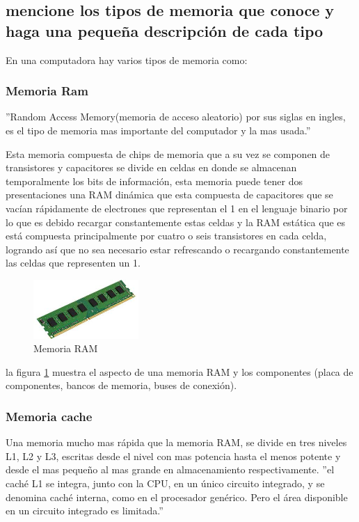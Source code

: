 \documentclass{article}
\begin{document}
    \subsection{mencione los tipos de memoria que conoce y haga una pequeña descripción de cada tipo}
    En una computadora hay varios tipos de memoria como: 
    
        \subsubsection{Memoria Ram}
        ''Random Access Memory(memoria de acceso aleatorio) por sus siglas en ingles, es el tipo de memoria mas importante del computador y la mas usada.'' \cite{arquitectura} \newline

        Esta memoria compuesta de chips de memoria que a su vez se componen de transistores y capacitores se divide en celdas en donde se almacenan temporalmente los bits de información, esta memoria puede tener dos presentaciones una RAM dinámica que esta compuesta de capacitores que se vacían rápidamente de electrones que representan el 1 en el lenguaje binario por lo que es debido recargar constantemente estas celdas y la RAM estática que es está compuesta principalmente por cuatro o seis transistores en cada celda, logrando así que no sea necesario estar refrescando o recargando constantemente las celdas que representen un 1.
        
        \begin{figure}[h]
        \includegraphics[width=4cm]{ram.jpg}
        \centering
        \caption{Memoria RAM}
        \label{fig:Memoria RAM}
        \end{figure}    
        
        la figura \ref{fig:Memoria RAM} muestra el aspecto de una memoria RAM y los componentes (placa de componentes, bancos de memoria, buses de conexión).
        
        \subsubsection{Memoria cache}
        Una memoria mucho mas rápida que la memoria RAM, se divide en tres niveles L1, L2 y L3, escritas desde el nivel con mas potencia hasta el menos potente y desde el mas pequeño al mas grande en almacenamiento respectivamente. ''el caché L1 se integra, junto con la CPU, en un único circuito integrado, y se denomina caché interna, como en el procesador genérico. Pero el área  disponible en un circuito integrado es limitada.'' \cite{Mano} 
        
\end{document}
